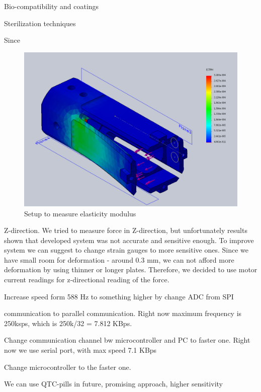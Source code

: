 Bio-compatibility and coatings

Sterilization techniques

Since 

\begin{figure}[h]
	\begin{center}
		\includegraphics[width=120mm]{fig/methods/NEW_SLEEVE_STRAIN.png}
	\end{center}
	\vspace{-4mm}
	\caption[Setup to measure elasticity modulus]
	{Setup to measure elasticity modulus}
	\label{fig:ElasModSet}
	\vspace{-2mm}
\end{figure}

Z-direction. We tried to measure force in Z-direction, but unfortunately results shown that developed system was not accurate and sensitive enough. To improve system we can suggest to change strain gauges to more sensitive ones. Since we have small room for deformation - around 0.3 mm, we can not afford more deformation by using thinner or longer plates. Therefore, we decided to use motor current readings for z-directional reading of the force.

Increase speed form 588 Hz to something higher by change ADC from SPI 

communication to parallel communication. Right now maximum frequency is 
250ksps, which is 250k/32 = 7.812 KBps.

 Change communication channel bw microcontroller and PC to faster one. Right 
 now we use serial port, with max speed 7.1 KBps 
 
Change microcontroller to the faster one. 

We can use QTC-pills in future, promising approach, higher sensitivity 